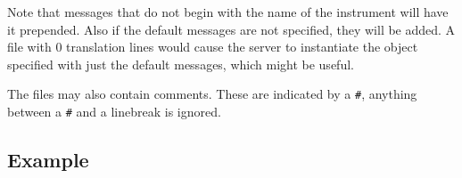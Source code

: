\documentclass[../main.tex]{subfiles}
\begin{document}
Note that messages that do not begin with the name of the instrument will have it prepended. Also if the default messages are not specified, 
they will be added. A file with 0 translation lines would cause the server to instantiate the object specified with just the default messages, which might be useful.

The files may also contain comments. These are indicated by a \texttt{\#}, anything between a \texttt{\#} and a linebreak is ignored.

%	
%	
%	
%	
%	
%	
%	
%	
%	
%	
%	
%	
%	
%	
%	
%	
%	
%	
%	
%	
%	
%
%

\subsection{Example}
\end{document}
